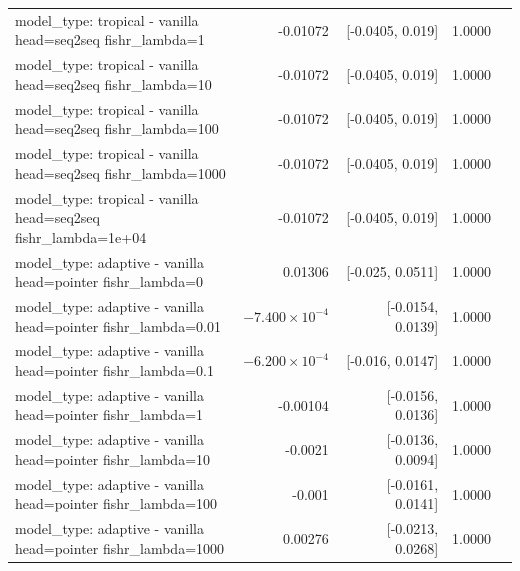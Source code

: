 \documentclass[10pt]{article}
\makeatletter
\newcommand{\stackcell}[1]{\begin{tabular}[t]{@{}l@{}}#1\end{tabular}}
\makeatother
\begin{document}
{\begin{longtable}{lrrrl}
\stackcell{model\_type: tropical - vanilla\\\footnotesize head=seq2seq fishr\_lambda=1 } & -0.01072 & [-0.0405, 0.019] & 1.0000 & \\
\stackcell{model\_type: tropical - vanilla\\\footnotesize head=seq2seq fishr\_lambda=10 } & -0.01072 & [-0.0405, 0.019] & 1.0000 & \\
\stackcell{model\_type: tropical - vanilla\\\footnotesize head=seq2seq fishr\_lambda=100 } & -0.01072 & [-0.0405, 0.019] & 1.0000 & \\
\stackcell{model\_type: tropical - vanilla\\\footnotesize head=seq2seq fishr\_lambda=1000 } & -0.01072 & [-0.0405, 0.019] & 1.0000 & \\
\stackcell{model\_type: tropical - vanilla\\\footnotesize head=seq2seq fishr\_lambda=1e+04 } & -0.01072 & [-0.0405, 0.019] & 1.0000 & \\
\stackcell{model\_type: adaptive - vanilla\\\footnotesize head=pointer fishr\_lambda=0 } & 0.01306 & [-0.025, 0.0511] & 1.0000 & \\
\stackcell{model\_type: adaptive - vanilla\\\footnotesize head=pointer fishr\_lambda=0.01 } & $-7.400\times10^{-4}$ & [-0.0154, 0.0139] & 1.0000 & \\
\stackcell{model\_type: adaptive - vanilla\\\footnotesize head=pointer fishr\_lambda=0.1 } & $-6.200\times10^{-4}$ & [-0.016, 0.0147] & 1.0000 & \\
\stackcell{model\_type: adaptive - vanilla\\\footnotesize head=pointer fishr\_lambda=1 } & -0.00104 & [-0.0156, 0.0136] & 1.0000 & \\
\stackcell{model\_type: adaptive - vanilla\\\footnotesize head=pointer fishr\_lambda=10 } & -0.0021 & [-0.0136, 0.0094] & 1.0000 & \\
\stackcell{model\_type: adaptive - vanilla\\\footnotesize head=pointer fishr\_lambda=100 } & -0.001 & [-0.0161, 0.0141] & 1.0000 & \\
\stackcell{model\_type: adaptive - vanilla\\\footnotesize head=pointer fishr\_lambda=1000 } & 0.00276 & [-0.0213, 0.0268] & 1.0000 & \\

\end{longtable}}
\end{document}
